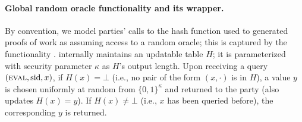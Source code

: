 \paragraph{Global random oracle functionality and its wrapper.}
%
By convention, we model parties' calls to the hash function used to generated proofs of work as assuming access to a random oracle; this is captured by the functionality \funcRO.
%
\funcRO internally maintains an updatable table $H$; it is parameterized with security parameter $\kappa$ as $H$'s output length.
%
Upon receiving a query $(\textsc{eval}, \mathrm{sid}, x)$, if $H(x) = \bot$ (i.e., no pair of the form $(x, \cdot)$ is in $H$), a value $y$ is chosen uniformly at random from $\{0, 1\}^\kappa$ and returned to the party (\funcRO also updates $H(x) = y$).
%
If $H(x) \neq \bot$ (i.e., $x$ has been queried before), the corresponding $y$ is returned.



